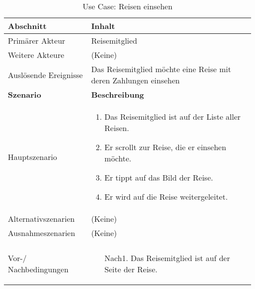 \begin{table}[H]
	\footnotesize
	\caption{Use Case: Reisen einsehen}
	\begin{tabularx}{0.95\textwidth}{ |l|X| }
		\hline
		\rowcolor{gray} \textbf{Abschnitt}     & \textbf{Inhalt}                                                  \\
		\hline
		Primärer Akteur                        & Reisemitglied                                                    \\
		\hline
		Weitere Akteure                        & (Keine)                                                          \\
		\hline
		Auslösende Ereignisse                  & Das Reisemitglied möchte eine Reise mit deren Zahlungen einsehen \\

		\hline
		\rowcolor{lightgray} \textbf{Szenario} & \textbf{Beschreibung}                                            \\
		\hline
		Hauptszenario                          & \begin{enumerate}
			                                         \item Das Reisemitglied ist auf der Liste aller Reisen.
			                                         \item Er scrollt zur Reise, die er einsehen möchte.
			                                         \item Er tippt auf das Bild der Reise.
			                                         \item Er wird auf die Reise weitergeleitet.
		                                         \end{enumerate}           \\
		\hline
		Alternativszenarien                    & (Keine)                                                          \\
		\hline
		Ausnahmeszenarien                      & (Keine)                                                          \\
		\hline
		\rowcolor{lightgray}                   &                                                                  \\
		\hline
		Vor-/ Nachbedingungen                  & \begin{enumerate}
			                                         \item[Nach1.] Das Reisemitglied ist auf der Seite der Reise.
		                                         \end{enumerate}      \\
		\hline
	\end{tabularx}
\end{table}


